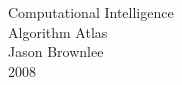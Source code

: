 %
%

\begin{titlepage}
\begin{center}

\vspace*{\fill} \Huge
Computational Intelligence 
\\
Algorithm Atlas
\\
\vfill\vfill\Large
Jason Brownlee
\\
\vfill\vfill
2008
\\
\vfill\vfill \normalsize

\vfill         

\end{center}

\end{titlepage}
